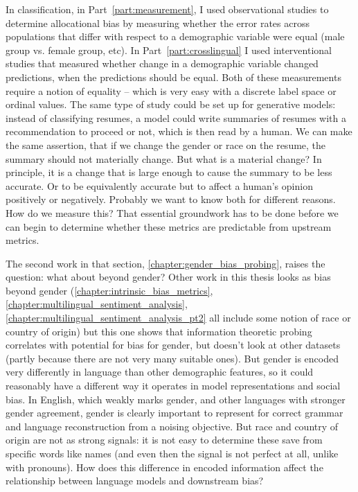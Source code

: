 In classification, in Part~\ref{part:measurement}, I used observational studies to determine allocational bias by measuring whether the error rates across populations that differ with respect to a demographic variable were equal (male group vs. female group, etc). In Part~\ref{part:crosslingual} I used interventional studies that measured whether change in a demographic variable changed predictions, when the predictions should be equal. Both of these measurements require a notion of equality -- which is very easy with a discrete label space or ordinal values. The same type of study could be set up for generative models: instead of classifying resumes, a model could write summaries of resumes with a recommendation to proceed or not, which is then read by a human. We can make the same assertion, that if we change the gender or race on the resume, the summary should not materially change. But what is a material change? In principle, it is a change that is large enough to cause the summary to be less accurate. Or to be equivalently accurate but to affect a human's opinion positively or negatively. Probably we want to know both for different reasons. How do we measure this? That essential groundwork has to be done before we can begin to determine whether these metrics are predictable from upstream metrics.

The second work in that section, \ref{chapter:gender_bias_probing}, raises the question: what about beyond gender? Other work in this thesis looks as bias beyond gender (\ref{chapter:intrinsic_bias_metrics}, \ref{chapter:multilingual_sentiment_analysis}, \ref{chapter:multilingual_sentiment_analysis_pt2} all include some notion of race or country of origin) but this one shows that information theoretic probing correlates with potential for bias for gender, but doesn't look at other datasets (partly because there are not very many suitable ones). But gender is encoded very differently in language than other demographic features, so it could reasonably have a different way it operates in model representations and social bias. In English, which weakly marks gender, and other languages with stronger gender agreement, gender is clearly important to represent for correct grammar and language reconstruction from a noising objective. But race and country of origin are not as strong signals: it is not easy to determine these save from specific words like names (and even then the signal is not perfect at all, unlike with pronouns). How does this difference in encoded information affect the relationship between language models and downstream bias?



